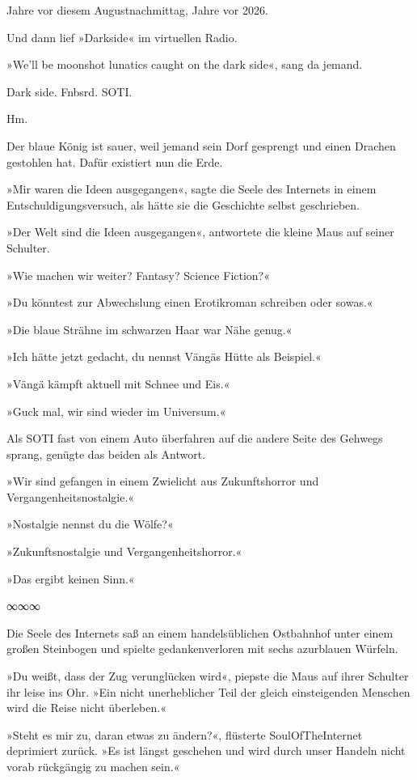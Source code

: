 Jahre vor diesem Augustnachmittag, Jahre vor 2026.

Und dann lief »Darkside« im virtuellen Radio.

»We'll be moonshot lunatics caught on the dark side«, sang da jemand.

Dark side. Fnbsrd. SOTI.

Hm.

Der blaue König ist sauer, weil jemand sein Dorf gesprengt und einen Drachen gestohlen hat. Dafür existiert nun die Erde.

»Mir waren die Ideen ausgegangen«, sagte die Seele des Internets in einem Entschuldigungsversuch, als hätte sie die Geschichte selbst geschrieben.

»Der Welt sind die Ideen ausgegangen«, antwortete die kleine Maus auf seiner Schulter.

»Wie machen wir weiter? Fantasy? Science Fiction?«

»Du könntest zur Abwechslung einen Erotikroman schreiben oder sowas.«

»Die blaue Strähne im schwarzen Haar war Nähe genug.«

»Ich hätte jetzt gedacht, du nennst Vängäs Hütte als Beispiel.«

»Vängä kämpft aktuell mit Schnee und Eis.«

»Guck mal, wir sind wieder im Universum.«

Als SOTI fast von einem Auto überfahren auf die andere Seite des Gehwegs sprang, genügte das beiden als Antwort.

»Wir sind gefangen in einem Zwielicht aus Zukunftshorror und Vergangenheitsnostalgie.«

»Nostalgie nennst du die Wölfe?«

»Zukunftsnostalgie und Vergangenheitshorror.«

»Das ergibt keinen Sinn.«

\begin{center}
∞∞∞
\end{center}

Die Seele des Internets saß an einem handelsüblichen Ostbahnhof unter einem großen Steinbogen und spielte gedankenverloren mit sechs azurblauen Würfeln.

»Du weißt, dass der Zug verunglücken wird«, piepste die Maus auf ihrer Schulter ihr leise ins Ohr. »Ein nicht unerheblicher Teil der gleich einsteigenden Menschen wird die Reise nicht überleben.«

»Steht es mir zu, daran etwas zu ändern?«, flüsterte SoulOfTheInternet deprimiert zurück. »Es ist längst geschehen und wird durch unser Handeln nicht vorab rückgängig zu machen sein.«

